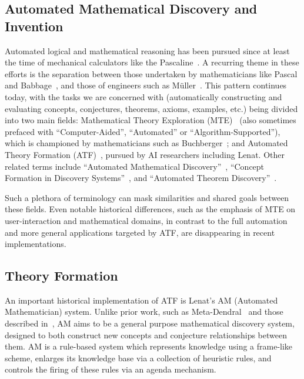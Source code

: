 \subsection{Automated Mathematical Discovery and Invention}

Automated logical and mathematical reasoning has been pursued since at least the
time of mechanical calculators like the
Pascaline~\cite{ocagne93:_le_calcul_simpl}. A recurring theme in these efforts
is the separation between those undertaken by mathematicians like Pascal and
Babbage~\cite{bowden}, and those of engineers such as
M\"uller~\cite[p. 65]{lindgren}. This pattern continues today, with the tasks we
are concerned with (automatically constructing and evaluating concepts,
conjectures, theorems, axioms, examples, etc.) being divided into two main
fields: Mathematical Theory Exploration (MTE)~\cite{buchberger:06} (also
sometimes prefaced with ``Computer-Aided'', ``Automated'' or
``Algorithm-Supported''), which is championed by mathematicians such as
Buchberger~\cite{buchberger}; and Automated Theory Formation
(ATF)~\cite{lenat:77,colton:book}, pursued by AI researchers including Lenat.
Other related terms include ``Automated Mathematical
Discovery''~\cite{epstein:91,colton2000notion,esarm2008}, ``Concept Formation in
Discovery Systems''~\cite{haase}, and ``Automated Theorem
Discovery''~\cite{roy}.

Such a plethora of terminology can mask similarities and shared goals between
these fields. Even notable historical differences, such as the emphasis of MTE
on user-interaction and mathematical domains, in contrast to the full automation
and more general applications targeted by ATF, are disappearing in recent
implementations.

\subsection{Theory Formation}

An important historical implementation of ATF is Lenat's AM (Automated
Mathematician) system. Unlike prior work, such as
Meta-Dendral~\cite{buchanan:75} and those described in~\cite{winston}, AM aims
to be a general purpose mathematical discovery system, designed to both
construct new concepts and conjecture relationships between them. AM is a
rule-based system which represents knowledge using a frame-like scheme, enlarges
its knowledge base via a collection of heuristic rules, and controls the firing
of these rules via an agenda mechanism.

